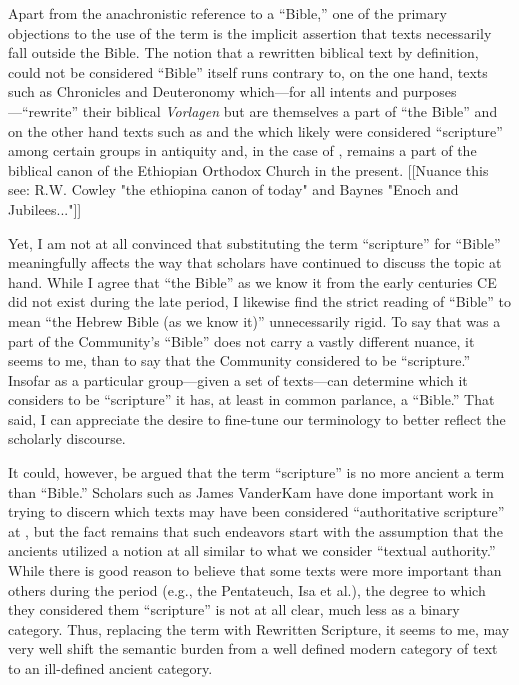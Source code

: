 Apart from the anachronistic reference to a ``Bible,'' one of the primary objections to the use of the term \rwb is the implicit assertion that \rwb texts necessarily fall outside the Bible.\autocite[61]{campbell_zsengeller2014} The notion that a rewritten biblical text by definition, could not be considered ``Bible'' itself runs contrary to, on the one hand, texts such as Chronicles and Deuteronomy which---for all intents and purposes---``rewrite'' their biblical \emph{Vorlagen} but are themselves a part of ``the Bible'' and on the other hand texts such as \jub and the \templescroll which likely were considered ``scripture'' among certain groups in antiquity and, in the case of \jub, remains a part of the biblical canon of the Ethiopian Orthodox Church in the present. [[Nuance this see: R.W. Cowley  "the ethiopina canon of today" and Baynes "Enoch and Jubilees..."]] 

Yet, I am not at all convinced that substituting the term ``scripture'' for ``Bible'' meaningfully affects the way that scholars have continued to discuss the topic at hand. While I agree that ``the Bible'' as we know it from the early centuries CE did not exist during the late \secondtemple period, I likewise find the strict reading of ``Bible'' to mean ``the Hebrew Bible (as we know it)'' unnecessarily rigid. To say that \jub was a part of the \qumran Community's ``Bible'' does not carry a vastly different nuance, it seems to me, than to say that the \qumran Community considered \jub to be ``scripture.'' Insofar as a particular group---given a set of texts---can determine which it considers to be ``scripture'' it has, at least in common parlance, a ``Bible.'' That said, I can appreciate the desire to fine-tune our terminology to better reflect the scholarly discourse. 

It could, however, be argued that the term ``scripture'' is no more ancient a term than ``Bible.'' Scholars such as James VanderKam have done important work in trying to discern which texts may have been considered ``authoritative scripture'' at \qumran,\autocite{vanderkam_dsd1998} but the fact remains that such endeavors start with the assumption that the ancients utilized a notion at all similar to what we consider ``textual authority.'' While there is good reason to believe that some texts were more important than others during the \secondtemple period (e.g., the Pentateuch, Isa et al.), the degree to which they considered them ``scripture'' is not at all clear, much less as a binary category. Thus, replacing the term \rwb with Rewritten Scripture, it seems to me, may very well shift the semantic burden from a well defined modern category of text to an ill-defined ancient category. 

